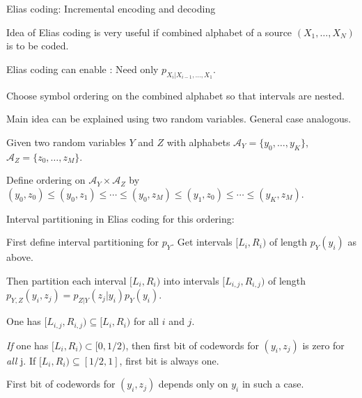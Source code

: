 \begin{frame}{Elias coding: Incremental encoding and decoding}
\bit
\item Idea of Elias coding is very useful if combined alphabet of a source $(X_1,\dots,X_N)$ is
to be coded.
\item  Elias coding can enable : Need only  $p_{X_i|X_{i-1},\dots,X_1}$.
\item{} Choose symbol ordering on the combined alphabet so that intervals are nested.
\eit
\vspace{-0.2cm}
\bit
\item Main idea can be explained using two random variables. General case analogous. 
\item Given two random variables $Y$ and $Z$ with alphabets $\mathcal{A}_Y=\{y_0,\dots,y_K\}$, $\mathcal{A}_Z=\{z_0,\dots,z_M\}$.
\item Define ordering on $\mathcal{A}_Y\times\mathcal{A}_Z$ by $(y_0,z_0)\leq (y_0,z_1)\leq\cdots\leq (y_0,z_M)\leq (y_1,z_0)\leq\cdots\leq (y_K,z_M)$.
\item Interval partitioning in Elias coding for this ordering: 
\bit
\item First define interval partitioning for $p_{Y}$. Get intervals $[L_i,R_i)$ of length $p_Y(y_i)$ as above. 
\item Then partition each interval $[L_i,R_i)$ into intervals $[L_{i,j},R_{i,j})$ of length  $p_{Y,Z}(y_i, z_j)=p_{Z|Y}(z_j|y_i)p_Y(y_i)$.
\item One has $[L_{i,j},R_{i,j})\subseteq [L_i,R_i)$ for all $i$ and $j$. 
\eit
\item \textit{If} one has $[L_i,R_i)\subset [0,1/2)$, then first bit of codewords for $(y_i,z_j)$
is zero for \textit{all} j. If $[L_i,R_i) \subseteq [1/2,1]$, first bit is always one. 
\item[\iarrow ] First bit of codewords for $(y_i,z_j)$ depends only on $y_i$ in such a case. 
\eit

\end{frame}

